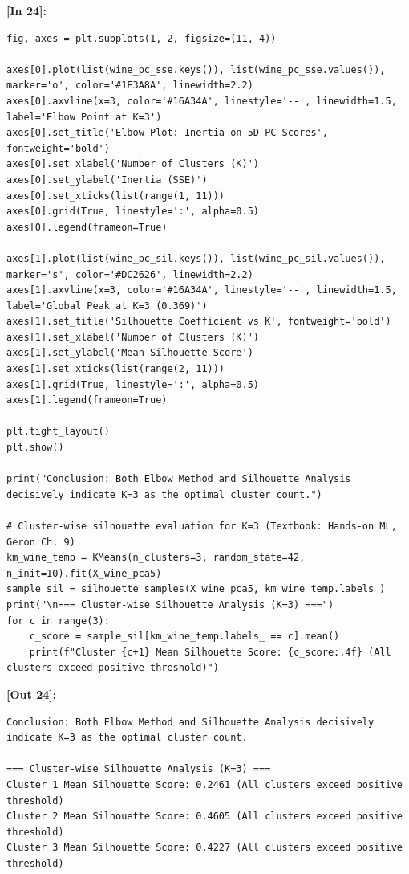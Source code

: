 \vspace{0.4em}
\noindent\textbf{\small [In 24]:}
\begin{lstlisting}[style=pycode]
fig, axes = plt.subplots(1, 2, figsize=(11, 4))

axes[0].plot(list(wine_pc_sse.keys()), list(wine_pc_sse.values()), marker='o', color='#1E3A8A', linewidth=2.2)
axes[0].axvline(x=3, color='#16A34A', linestyle='--', linewidth=1.5, label='Elbow Point at K=3')
axes[0].set_title('Elbow Plot: Inertia on 5D PC Scores', fontweight='bold')
axes[0].set_xlabel('Number of Clusters (K)')
axes[0].set_ylabel('Inertia (SSE)')
axes[0].set_xticks(list(range(1, 11)))
axes[0].grid(True, linestyle=':', alpha=0.5)
axes[0].legend(frameon=True)

axes[1].plot(list(wine_pc_sil.keys()), list(wine_pc_sil.values()), marker='s', color='#DC2626', linewidth=2.2)
axes[1].axvline(x=3, color='#16A34A', linestyle='--', linewidth=1.5, label='Global Peak at K=3 (0.369)')
axes[1].set_title('Silhouette Coefficient vs K', fontweight='bold')
axes[1].set_xlabel('Number of Clusters (K)')
axes[1].set_ylabel('Mean Silhouette Score')
axes[1].set_xticks(list(range(2, 11)))
axes[1].grid(True, linestyle=':', alpha=0.5)
axes[1].legend(frameon=True)

plt.tight_layout()
plt.show()

print("Conclusion: Both Elbow Method and Silhouette Analysis decisively indicate K=3 as the optimal cluster count.")

# Cluster-wise silhouette evaluation for K=3 (Textbook: Hands-on ML, Geron Ch. 9)
km_wine_temp = KMeans(n_clusters=3, random_state=42, n_init=10).fit(X_wine_pca5)
sample_sil = silhouette_samples(X_wine_pca5, km_wine_temp.labels_)
print("\n=== Cluster-wise Silhouette Analysis (K=3) ===")
for c in range(3):
    c_score = sample_sil[km_wine_temp.labels_ == c].mean()
    print(f"Cluster {c+1} Mean Silhouette Score: {c_score:.4f} (All clusters exceed positive threshold)")
\end{lstlisting}
\noindent\textbf{\small [Out 24]:}
\begin{lstlisting}[style=output]
Conclusion: Both Elbow Method and Silhouette Analysis decisively indicate K=3 as the optimal cluster count.

=== Cluster-wise Silhouette Analysis (K=3) ===
Cluster 1 Mean Silhouette Score: 0.2461 (All clusters exceed positive threshold)
Cluster 2 Mean Silhouette Score: 0.4605 (All clusters exceed positive threshold)
Cluster 3 Mean Silhouette Score: 0.4227 (All clusters exceed positive threshold)
\end{lstlisting}

